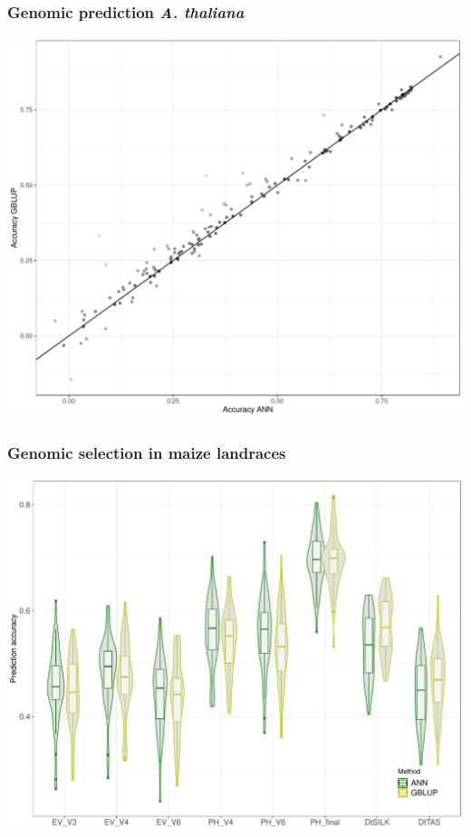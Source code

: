\documentclass{beamer}
\begin{document}
\begin{frame}
  \frametitle{Genomic prediction \textit{A. thaliana}}
  \includegraphics[height=.8\textheight,width=.9\textwidth]{ann_vs_gblup}
\end{frame}

\begin{frame}
  \frametitle{Genomic selection in maize landraces}
  \includegraphics[height=.8\textheight,width=.9\textwidth]{gp_kemater}
\end{frame}
\end{document}
